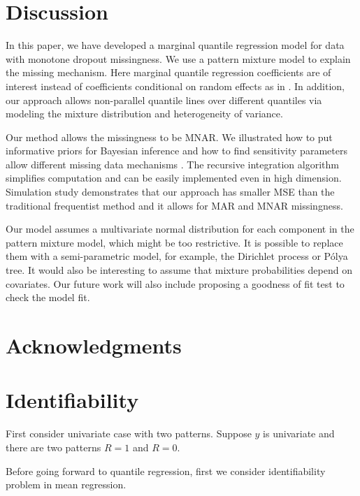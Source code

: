 \documentclass[12pt]{article}
\newcommand{\polya}{P\'{o}lya}
\begin{document}
\section{Discussion}
\label{sec:discussion}

In this paper, we have developed a marginal quantile regression model
for data with monotone dropout missingness. We use a pattern mixture
model to explain the missing mechanism. Here marginal quantile
regression coefficients are of interest instead of coefficients
conditional on random effects as in \citep{yuan2010}. In addition, our
approach allows non-parallel quantile lines over different quantiles
via modeling the mixture distribution and heterogeneity of variance.

Our method allows the missingness to be MNAR.  We illustrated how to
put informative priors for Bayesian inference and how to find
sensitivity parameters allow different missing data mechanisms .  The
recursive integration algorithm simplifies computation and can be
easily implemented even in high dimension.  Simulation study
demonstrates that our approach has smaller MSE than the traditional
frequentist method and it allows for MAR and MNAR missingness.

Our model assumes a multivariate normal distribution for each
component in the pattern mixture model, which might be too
restrictive. It is possible to replace them with a semi-parametric
model, for example, the Dirichlet process or \polya{} tree.  It would
also be interesting to assume that mixture probabilities depend on
covariates. Our future work will also include proposing a goodness of
fit test to check the model fit.

\section{Acknowledgments}



% 




\appendix 
\section{Identifiability}
\label{sec:iden}
First consider univariate case with two patterns. Suppose $y$ is
univariate and there are two patterns $R = 1$ and $R = 0$.

Before going forward to quantile regression, first we consider
identifiability problem in mean regression.
\end{document}
